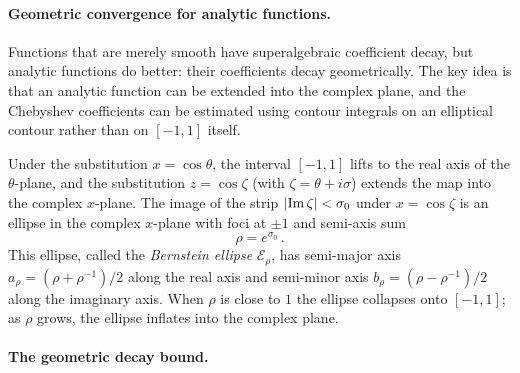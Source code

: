 \paragraph{Geometric convergence for analytic functions.}

Functions that are merely smooth have superalgebraic coefficient decay,
but analytic functions do better: their coefficients decay
geometrically.  The key idea is that an analytic function can be
extended into the complex plane, and the Chebyshev coefficients can
be estimated using contour integrals on an elliptical contour rather
than on $[-1,1]$ itself.

Under the substitution $x = \cos\theta$, the interval
$[-1,1]$ lifts to the real axis of the $\theta$-plane, and the
substitution $z = \cos\zeta$ (with $\zeta = \theta + i\sigma$)
extends the map into the complex $x$-plane.  The image of the strip
$\left\lvert \operatorname{Im}\zeta \right\rvert < \sigma_0$ under $x = \cos\zeta$ is
an ellipse in the complex $x$-plane with foci at $\pm 1$ and
semi-axis sum
%
\begin{equation}
  \rho = e^{\sigma_0} \,.
  \label{eq:bernstein-rho}
\end{equation}
%
This ellipse, called the \emph{Bernstein ellipse} $\mathcal{E}_\rho$,
has semi-major axis $a_\rho = (\rho + \rho^{-1})/2$ along the real
axis and semi-minor axis $b_\rho = (\rho - \rho^{-1})/2$ along the
imaginary axis.  When $\rho$ is close to $1$ the ellipse collapses
onto $[-1,1]$; as $\rho$ grows, the ellipse inflates into the complex
plane.
%

\paragraph{The geometric decay bound.}

